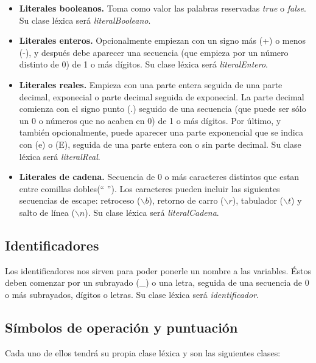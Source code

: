 \begin{itemize}
    \item \textbf{Literales booleanos.} Toma como valor las palabras reservadas \textit{true} o \textit{false}. Su clase léxica será
        \textit{literalBooleano}.
    \item \textbf{Literales enteros.} Opcionalmente empiezan con un signo más (+) o menos (-), y después debe aparecer una
        secuencia (que empieza por un número distinto de 0) de 1 o más dígitos. Su clase léxica será \textit{literalEntero}.
    \item \textbf{Literales reales.} Empieza con una parte entera seguida de una parte decimal, exponecial o parte decimal seguida de exponecial. La parte decimal comienza con el signo punto (.) seguido de una secuencia (que puede ser sólo un 0 o números que no acaben en 0) de 1 o más dígitos. Por último, y también opcionalmente, puede aparecer una parte exponencial que se indica con (e) o (E), seguida de una parte entera con o sin parte decimal. Su clase léxica será \textit{literalReal}.
    \item \textbf{Literales de cadena.} Secuencia de 0 o más caracteres distintos que estan entre comillas dobles(`` ''). Los caracteres pueden incluir las siguientes secuencias de
    escape: retroceso ($\backslash{b}$), retorno de carro ($\backslash{r}$), tabulador ($\backslash{t}$) y salto de línea ($\backslash{n}$). Su clase léxica será \textit{literalCadena}.
\end{itemize}

\subsection{Identificadores}

Los identificadores nos sirven para poder ponerle un nombre a las variables. Éstos deben comenzar por un subrayado (\_) o una letra, seguida de una secuencia de 0 o más
subrayados, dígitos o letras. Su clase léxica será \textit{identificador}.

\subsection{Símbolos de operación y puntuación}

Cada uno de ellos tendrá su propia clase léxica y son las siguientes clases:


